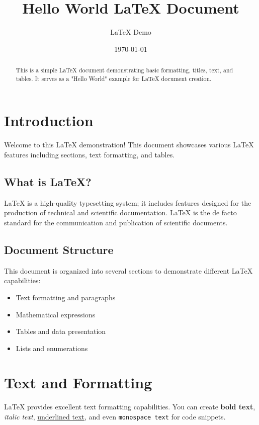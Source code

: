 \documentclass[12pt]{article}
\title{Hello World LaTeX Document}
\author{LaTeX Demo}
\date{\today}
\begin{document}
\maketitle

\begin{abstract}
This is a simple LaTeX document demonstrating basic formatting, titles, text, and tables. It serves as a "Hello World" example for LaTeX document creation.
\end{abstract}

\tableofcontents
\newpage

\section{Introduction}

Welcome to this LaTeX demonstration! This document showcases various LaTeX features including sections, text formatting, and tables.

\subsection{What is LaTeX?}

LaTeX is a high-quality typesetting system; it includes features designed for the production of technical and scientific documentation. LaTeX is the de facto standard for the communication and publication of scientific documents.

\subsection{Document Structure}

This document is organized into several sections to demonstrate different LaTeX capabilities:
\begin{itemize}
    \item Text formatting and paragraphs
    \item Mathematical expressions
    \item Tables and data presentation
    \item Lists and enumerations
\end{itemize}

\section{Text and Formatting}

LaTeX provides excellent text formatting capabilities. You can create \textbf{bold text}, \textit{italic text}, \underline{underlined text}, and even \texttt{monospace text} for code snippets.
\end{document}
